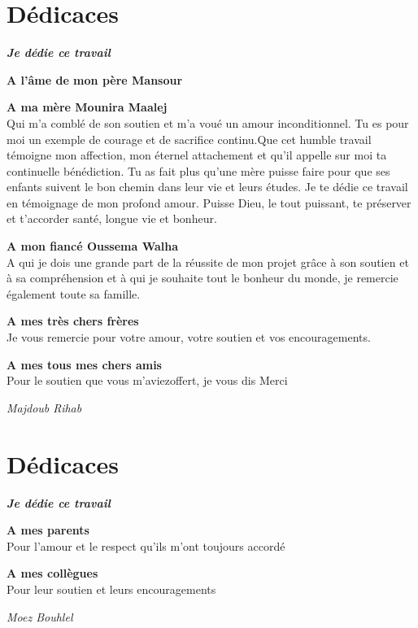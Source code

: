 \section*{Dédicaces}
\vspace{1.0in}

\begin{center}
    \slshape
    \textbf{Je dédie ce travail}

    \bigskip
    \textbf{A l'âme de mon père Mansour}

    \textbf{A ma mère Mounira Maalej} \\
    Qui m'a comblé de son soutien et m'a voué un amour inconditionnel. Tu
    es pour moi un exemple de courage et de sacrifice continu.Que cet
    humble travail témoigne mon affection, mon éternel attachement et qu'il
    appelle sur moi ta continuelle bénédiction. Tu as fait plus qu’une mère
    puisse faire pour que ses enfants suivent le bon chemin dans leur vie
    et leurs études.  Je te dédie ce travail en témoignage de mon profond
    amour. Puisse Dieu, le tout puissant, te préserver et t’accorder santé,
    longue vie et bonheur.

    \textbf{A mon fiancé Oussema Walha} \\
    A qui je dois une grande part de la réussite de mon projet grâce à son
    soutien et à sa compréhension et à qui je souhaite tout le bonheur du
    monde, je remercie également toute sa famille.

    \textbf{A mes très chers frères}  \\
    Je vous remercie pour votre amour, votre soutien et vos encouragements.

    \textbf{A mes tous mes chers amis} \\
    Pour le soutien que vous m'aviezoffert, je vous dis Merci

    \begin{flushright}
        \textit{Majdoub Rihab}
    \end{flushright}
\end{center}

\clearpage

\section*{Dédicaces}
\vspace{1.0in}

\begin{center}
    \slshape
    \textbf{Je dédie ce travail}

    \bigskip
    \textbf{A mes parents} \\
    Pour l'amour et le respect qu'ils m'ont toujours accordé

    \textbf{A mes collègues} \\
    Pour leur soutien et leurs encouragements

    \begin{flushright}
        \textit{Moez Bouhlel}
    \end{flushright}
\end{center}
